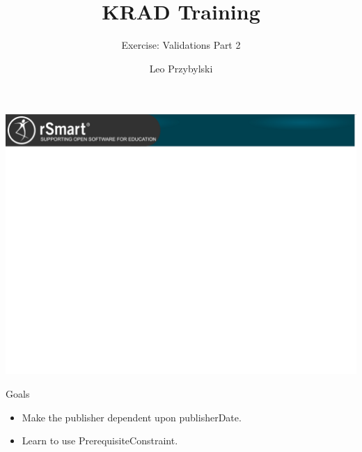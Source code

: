 \documentclass[xcolor=dvipsnames,14pt,professionalfonts]{beamer}
\begin{document}
\title{KRAD Training}
\subtitle{Exercise: Validations Part 2}
\author[Leo]{Leo Przybylski}

\usebackgroundtemplate%
{%
    \includegraphics[width=\paperwidth,height=\paperheight]{../img/header.png}%
}

{
%
\begin{frame}[plain]
  \titlepage
\end{frame}
}

\begin{frame}{Goals}
  \begin{itemize}
    \item Make the publisher dependent upon publisherDate.
    \item Learn to use PrerequisiteConstraint.
  \end{itemize}
\end{frame}
\end{document}
